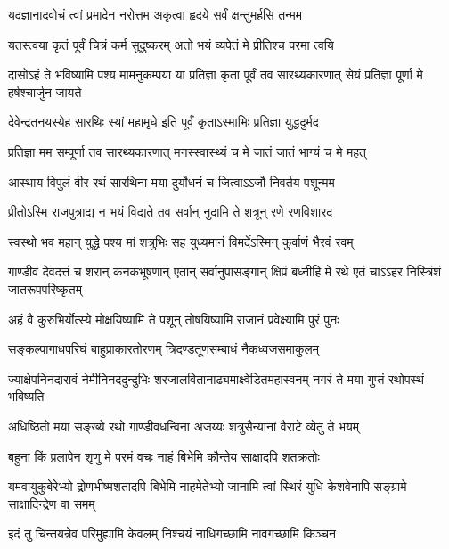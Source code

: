 \twolineshloka
{यदज्ञानादवोचं त्वां प्रमादेन नरोत्तम}
{अकृत्वा हृदये सर्वं क्षन्तुमर्हसि तन्मम}


\twolineshloka
{यतस्त्वया कृतं पूर्वं चित्रं कर्म सुदुष्करम्}
{अतो भयं व्यपेतं मे प्रीतिश्च परमा त्वयि}


\onelineshloka
{दासोऽहं ते भविष्यामि पश्य मामनुकम्पया}
\twolineshloka
{या प्रतिज्ञा कृता पूर्वं तव सारथ्यकारणात्}
{सेयं प्रतिज्ञा पूर्णा मे हर्षश्चार्जुन जायते}


\twolineshloka
{देवेन्द्रतनयस्येह सारथिः स्यां महामृधे}
{इति पूर्वं कृताऽस्माभिः प्रतिज्ञा युद्धदुर्मद}


\twolineshloka
{प्रतिज्ञा मम सम्पूर्णा तव सारथ्यकारणात्}
{मनस्स्वास्थ्यं च मे जातं जातं भाग्यं च मे महत्}


\twolineshloka
{आस्थाय विपुलं वीर रथं सारथिना मया}
{दुर्योधनं च जित्वाऽऽजौ निवर्तय पशून्मम}




\twolineshloka
{प्रीतोऽस्मि राजपुत्राद्य न भयं विद्यते तव}
{सर्वान् नुदामि ते शत्रून् रणे रणविशारद}


\twolineshloka
{स्वस्थो भव महान् युद्धे पश्य मां शत्रुभिः सह}
{युध्यमानं विमर्देऽस्मिन् कुर्वाणं भैरवं रवम्}


\threelineshloka
{गाण्डीवं देवदत्तं च शरान् कनकभूषणान्}
{एतान् सर्वानुपासङ्गान् क्षिप्रं बध्नीहि मे रथे}
{एतं चाऽऽहर निस्त्रिंशं जातरूपपरिष्कृतम्}


\twolineshloka
{अहं वै कुरुभिर्योत्स्ये मोक्षयिष्यामि ते पशून्}
{तोषयिष्यामि राजानं प्रवेक्ष्यामि पुरं पुनः}


\twolineshloka
{सङ्कल्पागाधपरिघं बाहुप्राकारतोरणम्}
{त्रिदण्डतूणसम्बाधं नैकध्वजसमाकुलम्}


\threelineshloka
{ज्याक्षेपनिनदारावं नेमीनिनददुन्दुभिः}
{शरजालवितानाढ्यमाक्ष्वेडितमहास्वनम्}
{नगरं ते मया गुप्तं रथोपस्थं भविष्यति}


\twolineshloka
{अधिष्ठितो मया सङ्ख्ये रथो गाण्डीवधन्विना}
{अजय्यः शत्रुसैन्यानां वैराटे व्येतु ते भयम्}




\twolineshloka
{बहुना किं प्रलापेन शृणु मे परमं वचः}
{नाहं बिभेमि कौन्तेय साक्षादपि शतक्रतोः}


\threelineshloka
{यमवायुकुबेरेभ्यो द्रोणभीष्मशतादपि}
{बिभेमि नाहमेतेभ्यो जानामि त्वां स्थिरं युधि}
{केशवेनापि सङ्ग्रामे साक्षादिन्द्रेण वा समम्}


\twolineshloka
{इदं तु चिन्तयन्नेव परिमुह्यामि केवलम्}
{निश्चयं नाधिगच्छामि नावगच्छामि किञ्चन}


